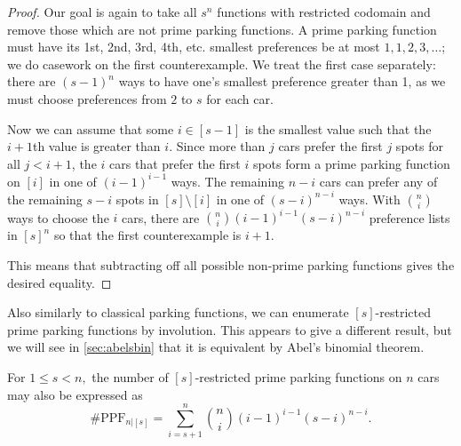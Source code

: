 \documentclass[12pt]{article}
\begin{document}
\begin{proof}
	Our goal is again to take all $s^n$ functions with restricted codomain and remove those which are not prime parking functions. A prime parking function must have its 1st, 2nd, 3rd, 4th, etc. smallest preferences be at most $1,1,2,3,\ldots$; we do casework on the first counterexample. We treat the first case separately: there are $(s-1)^n$ ways to have one's smallest preference greater than 1, as we must choose preferences from $2$ to $s$ for each car.
    
    Now we can assume that some $i\in [s-1]$ is the smallest value such that the $i+1$th value is greater than $i$. Since more than $j$ cars prefer the first $j$ spots for all $j < i+1$, the $i$ cars that prefer the first $i$ spots form a prime parking function on $[i]$ in one of $(i - 1)^{i - 1}$ ways. The remaining $n - i$ cars can prefer any of the remaining $s - i$ spots in $[s] \setminus [i]$ in one of $(s - i)^{n - i}$ ways. With $\binom{n}{i}$ ways to choose the $i$ cars, there are $\binom{n}{i} (i - 1)^{i - 1} (s - i)^{n - i}$ preference lists in $[s]^{n}$ so that the first counterexample is $i+1$.

    This means that subtracting off all possible non-prime parking functions gives the desired equality.
\end{proof}

Also similarly to classical parking functions, we can enumerate $[s]$-restricted prime parking functions by involution. This appears to give a different result, but we will see in \cref{sec:abelsbin} that it is equivalent by Abel's binomial theorem.

\begin{theorem}
    \label{thm:resPPFcount2}
    For $1 \le s < n,$ the number of $[s]$-restricted prime parking functions on $n$ cars may also be expressed as
    \[\#\mathrm{PPF}_{n|[s]}=\sum_{i = s + 1}^{n} \binom{n}{i} (i - 1)^{i - 1} (s - i)^{n - i}.\]
\end{theorem}
\end{document}
